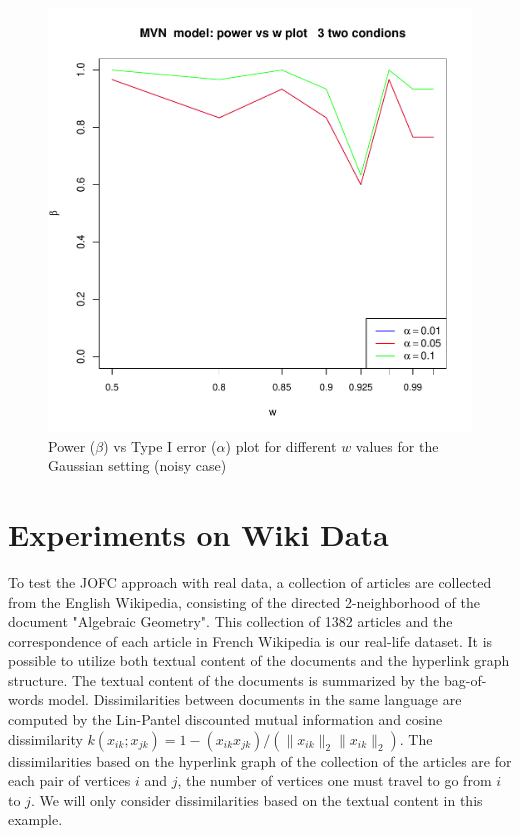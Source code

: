 \documentclass[11pt]{article} %
\begin{document}
\begin{figure}
\includegraphics[scale=0.95]{OOSMVN-power-w-c0-01-3-cond.pdf}
\caption{Power ($\beta$) vs Type I error ($\alpha$) plot for different $w$ values for the Gaussian setting (noisy case)}
\label{fig:MVN-c001-power-w-Kcond}
\end{figure}

\section{Experiments on Wiki Data}
To test the JOFC approach with real data, a collection of articles are collected from the English Wikipedia, consisting of the
 directed 2-neighborhood of the document "Algebraic Geometry". 
   This  collection of 1382 articles and the correspondence of each article in French 
Wikipedia is our real-life dataset. It is possible to utilize both textual content of the documents and the hyperlink graph structure. The textual content of the documents is summarized by the bag-of-words model. Dissimilarities between documents  in the same language are computed by the Lin-Pantel discounted mutual information \cite{LinPantel}
 and cosine dissimilarity $k(x_{ik}; x_{jk}) = 1 - (x_{ik} x_{jk})/(\|x_{ik}\|_2\|x_{ik}\|_2)$. 
 The dissimilarities based on the hyperlink graph of the collection of the articles are 
 for each pair of vertices $i$ and $j$, the number of vertices one must travel to go from $i$ to $j$.   
We will only consider dissimilarities based on the textual content in this example.
   
\end{document}
